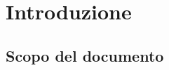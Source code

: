 \newcommand{\sharedPath}{../shared}
\newcommand{\doctitle}{Piano di Progetto}









\section{Introduzione}

\subsection{Scopo del documento}




